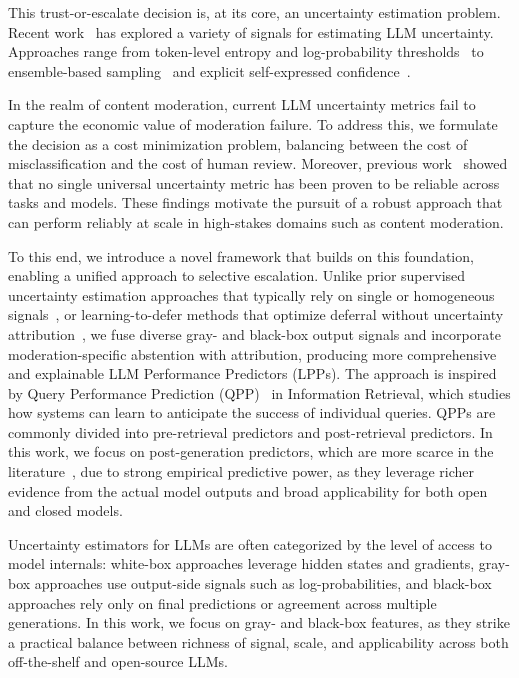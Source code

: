 This trust-or-escalate decision is, at its core, an uncertainty estimation problem. 
Recent work~\cite{shorinwa2025surveyuncertaintyquantificationlarge,  farr+al:25, kapoor2024large, cohen2024i, efficient-and-effective, liu+al:24} has explored a variety of signals for estimating LLM uncertainty. Approaches range from token-level entropy and log-probability thresholds~\cite{jiang+al:21, huly+al:25} to ensemble-based sampling~\cite{farr+al:25} and explicit self-expressed confidence~\cite{tian+al:23, kadavath+al:22, lin+al:22, xiong+al:23}.

In the realm of content moderation, current LLM uncertainty metrics fail to capture the economic value of moderation failure. To address this, we formulate the decision as a cost minimization problem, balancing between the cost of misclassification and the cost of human review. Moreover, previous work~\cite{shorinwa2025surveyuncertaintyquantificationlarge,jiang+al:21} showed that no single universal uncertainty metric has been proven to be reliable across tasks and models. These findings motivate the pursuit of a robust approach that can perform reliably at scale in high-stakes domains such as content moderation. 

To this end, we introduce a novel framework that builds on this foundation, enabling a unified approach to selective escalation. Unlike prior supervised uncertainty estimation approaches that typically rely on single or homogeneous signals~\cite{liu+al:24, jiang+al:21, hendrycks2017a}, or learning-to-defer methods that optimize deferral without uncertainty attribution~\cite{geifman2017selectiveclassificationdeepneural, mozannar2021consistentestimatorslearningdefer}, we fuse diverse gray- and black-box output signals and incorporate moderation-specific abstention with attribution, producing more comprehensive and explainable LLM Performance Predictors (LPPs). The approach is inspired by Query Performance Prediction (QPP)~\cite{carmel+Elad:10,hauff+al:08,shtok+al:16,shtok+al:12,tao+al:14,zhou+croft:07} in Information Retrieval, which studies how systems can learn to anticipate the success of individual queries. QPPs are commonly divided into pre-retrieval predictors and post-retrieval predictors. In this work, we focus on post-generation predictors, which are more scarce in the literature~\cite{huly+al:25}, due to strong empirical predictive power, as they leverage richer evidence from the actual model outputs and broad applicability for both open and closed models.

Uncertainty estimators for LLMs are often categorized by the level of access to model internals: white-box approaches leverage hidden states and gradients, gray-box approaches use output-side signals such as log-probabilities, and black-box approaches rely only on final predictions or agreement across multiple generations. In this work, we focus on gray- and black-box features, as they strike a practical balance between richness of signal, scale, and applicability across both off-the-shelf and open-source LLMs.

